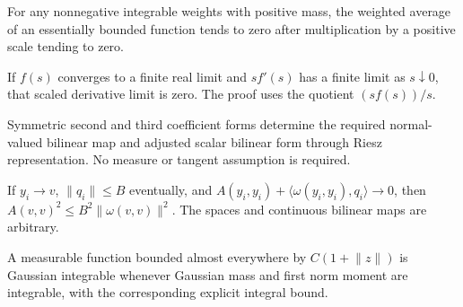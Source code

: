 \begin{lemma}
\label{lem:scale-normalized-bounded-integral}

For any nonnegative integrable weights with positive mass, the weighted average of an essentially bounded function tends to zero after multiplication by a positive scale tending to zero.
\end{lemma}

\begin{lemma}
\label{lem:scale-derivative-limit}

If $f(s)$ converges to a finite real limit and $s f\prime(s)$ has a finite limit as $s\downarrow0$, that scaled derivative limit is zero. The proof uses the quotient $(sf(s))/s$.
\end{lemma}

\begin{lemma}
\label{lem:rigidity-forms-from-symmetry}

Symmetric second and third coefficient forms determine the required normal-valued bilinear map and adjusted scalar bilinear form through Riesz representation. No measure or tangent assumption is required.
\end{lemma}

\begin{lemma}
\label{lem:quadratic-bound-bounded-offsets}

If $y_i\to v$, $\lVert q_i\rVert\le B$ eventually, and $A(y_i,y_i)+\langle\omega(y_i,y_i),q_i\rangle\to0$, then $A(v,v)^2\le B^2\lVert\omega(v,v)\rVert^2$. The spaces and continuous bilinear maps are arbitrary.
\end{lemma}

\begin{lemma}
\label{lem:gaussian-linear-growth-integral}

A measurable function bounded almost everywhere by $C(1+\lVert z\rVert)$ is Gaussian integrable whenever Gaussian mass and first norm moment are integrable, with the corresponding explicit integral bound.
\end{lemma}


